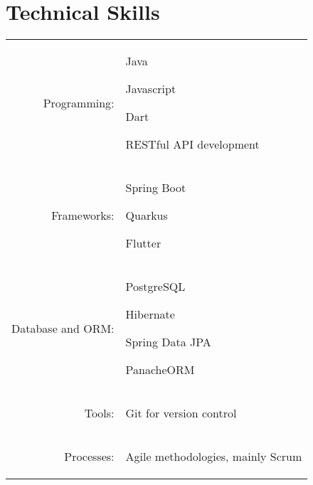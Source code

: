 \documentclass[a4paper,11pt]{article}
\begin{document}

\section{Technical Skills}
\begin{tabular}{rp{15.2cm}}
\raggedleft Programming:
& \begin{itemize*}[label=\textbullet] %
    \item Java
    \item Javascript
    \item Dart
    \item RESTful API development
\end{itemize*}\\
\raggedleft Frameworks:
& \begin{itemize*}[label=\textbullet]
    \item Spring Boot
    \item Quarkus
    \item Flutter
\end{itemize*}\\
\raggedleft Database and ORM:
& \begin{itemize*}[label=\textbullet]
    \item PostgreSQL
    \item Hibernate
    \item Spring Data JPA
    \item PanacheORM
\end{itemize*}\\
\raggedleft Tools:
& \begin{itemize*}[label=\textbullet]
    \item Git for version control
\end{itemize*}\\
\raggedleft Processes:
& \begin{itemize*}[label=\textbullet]
    \item Agile methodologies, mainly Scrum

\end{itemize*}
\end{tabular}
\end{document}

